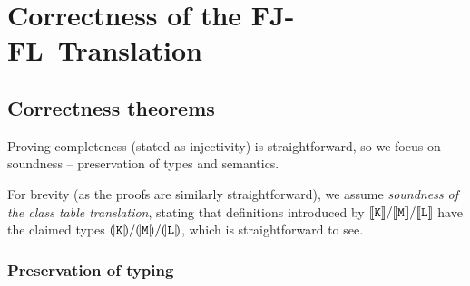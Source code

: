 \chapter{Correctness of the FJ-FL~Translation}
\label{extra:fj-fl-proofs}

\section{Correctness theorems}

Proving completeness (stated as injectivity) is straightforward, so we focus on soundness -- preservation of types and semantics. 

For brevity (as the proofs are similarly straightforward), we assume \emph{soundness of the class table translation}, stating that definitions introduced by $\denot {\fj K}/\denot {\fj M}/\denot {\fj L}$ have the claimed types $\denoty {\fj K}/\denoty {\fj M}/\denoty {\fj L}$, which is straightforward to see.

\subsection{Preservation of typing}

